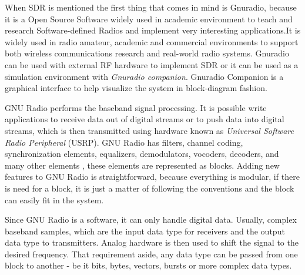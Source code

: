 When SDR is mentioned the first thing that comes in mind is Gnuradio, because
it is a Open Source Software widely used in academic environment to teach and
research Software-defined Radios and implement very interesting applications.It
is widely used in radio amateur, academic and commercial environments to
support both wireless communications research and real-world radio systems.
Gnuradio can be used with external RF hardware to implement SDR or it can be
used as a simulation environment with \textit{Gnuradio companion}. Gnuradio
Companion is a graphical interface to help visualize the system in
block-diagram fashion.





GNU Radio performs the baseband signal processing. It is possible write
applications to receive data out of digital streams or to push data into digital
streams, which is then transmitted using hardware known as \textit{Universal
Software Radio Peripheral} (USRP). GNU Radio has filters, channel coding,
synchronization elements, equalizers, demodulators, vocoders, decoders, and many
other elements , these elements are represented as blocks. Adding new features
to GNU Radio is straightforward, because everything is modular, if there is need
for a block, it is just a matter of following the conventions and the block can
easily fit in the system.

Since GNU Radio is a software, it can only handle digital data. Usually, complex
baseband samples, which are the input data type for receivers and the output
data type to transmitters. Analog hardware is then used to shift the signal to
the desired frequency. That requirement aside, any data type can be passed from
one block to another - be it bits, bytes, vectors, bursts or more complex data
types.

